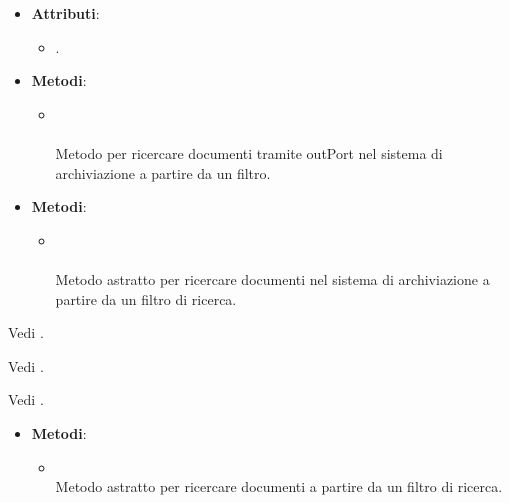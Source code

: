 \documentclass[10pt, a4paper]{article}
\begin{document}
\label{GetDocumentsMetadataDettaglio}
\begin{itemize}
    \item \textbf{Attributi}:
    \begin{itemize}
        \item {}.
    \end{itemize}
    \item \textbf{Metodi}:
    \begin{itemize}
        \item {}\\ \\
        Metodo per ricercare documenti tramite outPort nel sistema di archiviazione a partire da un filtro.
    \end{itemize}
\end{itemize}

\label{GetDocumentsMetadataPortDettaglio}
\begin{itemize}
    \item \textbf{Metodi}:
    \begin{itemize}
        \item {}\\ \\
        Metodo astratto per ricercare documenti nel sistema di archiviazione a partire da un filtro di ricerca.
    \end{itemize}
\end{itemize}


Vedi .

Vedi .

Vedi .

\label{GetDocumentsUseCaseDettaglio}
\begin{itemize}
    \item \textbf{Metodi}:
    \begin{itemize}
        \item {}\\
        Metodo astratto per ricercare documenti a partire da un filtro di ricerca.
    \end{itemize}
\end{itemize}
\end{document}
